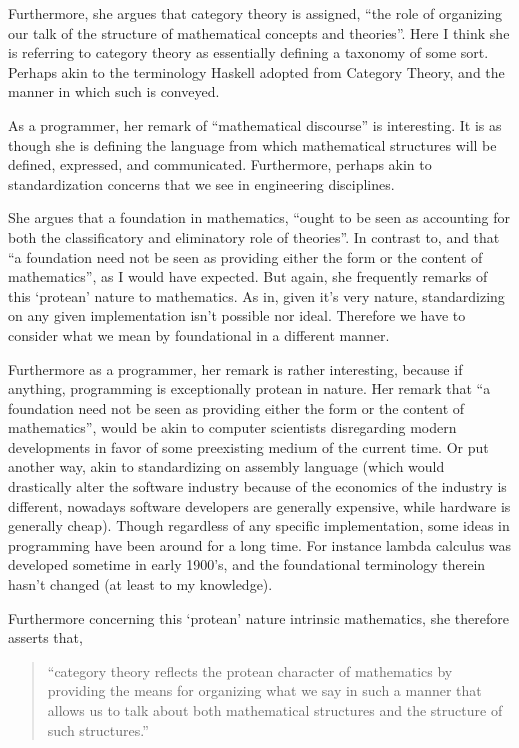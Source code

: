 Furthermore, she argues that category theory is assigned, ``the role of organizing our talk of the structure of mathematical concepts and theories''. Here I think she is referring to category theory as essentially defining a taxonomy of some sort. Perhaps akin to the terminology Haskell adopted from Category Theory, and the manner in which such is conveyed. 

As a programmer, her remark of ``mathematical discourse'' is interesting. It is as though she is defining the language from which mathematical structures will be defined, expressed, and communicated. Furthermore, perhaps akin to standardization concerns that we see in engineering disciplines.

She argues that a foundation in mathematics, ``ought to be seen as accounting for both the classificatory and eliminatory role of theories''. In contrast to, and that ``a foundation need not be seen as providing either the form or the content of mathematics'', as I would have expected. But again, she frequently remarks of this `protean' nature to mathematics. As in, given it’s very nature, standardizing on any given implementation isn’t possible nor ideal. Therefore we have to consider what we mean by foundational in a different manner. 

Furthermore as a programmer, her remark is rather interesting, because if anything, programming is exceptionally protean in nature. Her remark that ``a foundation need not be seen as providing either the form or the content of mathematics'', would be akin to computer scientists disregarding modern developments in favor of some preexisting medium of the current time. Or put another way, akin to standardizing on assembly language (which would drastically alter the software industry because of the economics of the industry is different, nowadays software developers are generally expensive, while hardware is generally cheap). Though regardless of any specific implementation, some ideas in programming have been around for a long time. For instance lambda calculus was developed sometime in early 1900’s, and the foundational terminology therein hasn’t changed (at least to my knowledge).

Furthermore concerning this `protean' nature intrinsic mathematics, she therefore asserts that, 
\begin{quotation}
``category theory reflects the protean character of mathematics by providing the means for organizing what we say in such a manner that allows us to talk about both mathematical structures and the structure of such structures.''
\end{quotation}

